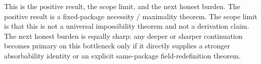 \documentclass[11pt]{article}
\begin{document}
This is the positive result, the scope limit, and the next honest burden. The positive result is a fixed-package necessity / maximality theorem. The scope limit is that this is not a universal impossibility theorem and not a derivation claim. The next honest burden is equally sharp: any deeper or sharper continuation becomes primary on this bottleneck only if it directly supplies a stronger absorbability identity or an explicit same-package field-redefinition theorem.
\end{document}
